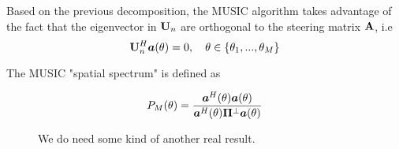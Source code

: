 Based on the previous decomposition, the MUSIC algorithm takes advantage of the fact that the eigenvector in $\mathbf{U}_n$ are orthogonal to the steering matrix $\mathbf{A}$, i.e
\begin{equation}
	\mathbf{U}_n^H\bm{a}(\theta) = 0\\, \quad \theta \in \left\{\theta_1,...,\theta_M\right\}
\end{equation}



The MUSIC "spatial spectrum" is defined as 

\begin{equation}
	P_M (\theta) = \frac{\bm{a}^H(\theta)\bm{a}(\theta)}{\bm{a}^H(\theta)\mathbf{\Pi}^\bot\bm{a}(\theta)}
\end{equation}

\begin{figure}[h!]
	\centering
	
	\caption{We do need some kind of another real result.}
\end{figure} 
